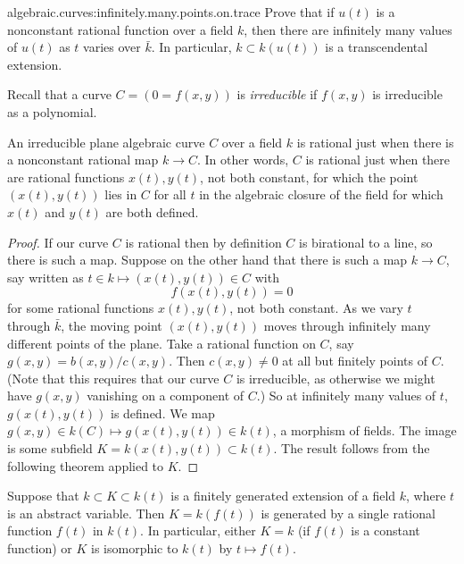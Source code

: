 \begin{problem}{algebraic.curves:infinitely.many.points.on.trace}
Prove that if \(u(t)\) is a nonconstant rational function over a field \(k\), then there are infinitely many values of \(u(t)\) as \(t\) varies over \(\bar{k}\).
In particular, \(k \subset k(u(t))\) is a transcendental extension.
\end{problem}
Recall that a curve \(C=(0=f(x,y))\) is \emph{irreducible}
%
% 
%
if \(f(x,y)\) is irreducible as a polynomial.
\begin{theorem}
An irreducible plane algebraic curve \(C\) over a field \(k\) is rational just when there is a nonconstant rational map \(k \to C\).
In other words, \(C\) is rational just when there are rational functions \(x(t),y(t)\), not both constant, for which the point \((x(t),y(t))\) lies in \(C\) for all \(t\) in the algebraic closure of the field for which \(x(t)\) and \(y(t)\) are both defined.
\end{theorem}
\begin{proof}
If our curve \(C\) is rational then by definition \(C\) is birational to a line, so there is such a map.
Suppose on the other hand that there is such a map \(k \to C\), say written as \(t \in k \mapsto (x(t),y(t)) \in C\) with
\[
f(x(t),y(t))=0
\]
for some rational functions \(x(t), y(t)\), not both constant.
As we vary \(t\) through \(\bar{k}\), the moving point \((x(t),y(t))\) moves through infinitely many different points of the plane.
Take a rational function on \(C\), say \(g(x,y)=b(x,y)/c(x,y)\).
Then \(c(x,y)\ne 0\) at all but finitely points of \(C\).
(Note that this requires that our curve \(C\) is irreducible, as otherwise we might have \(g(x,y)\) vanishing on a component of \(C\).)
So at infinitely many values of \(t\), \(g(x(t),y(t))\) is defined.
We map \(g(x,y) \in k(C) \mapsto g(x(t),y(t)) \in k(t)\), a morphism of fields. 
The image is some subfield \(K=k(x(t),y(t)) \subset k(t)\).
The result follows from the following theorem applied to \(K\).
\end{proof}
\begin{theorem}
Suppose that \(k \subset K \subset k(t)\) is a finitely generated extension of a field \(k\), where \(t\) is an abstract variable.
Then \(K=k(f(t))\) is generated by a single rational function \(f(t)\) in \(k(t)\).
In particular, either \(K=k\) (if \(f(t)\) is a constant function) or \(K\) is isomorphic to \(k(t)\) by \(t \mapsto f(t)\).
\end{theorem}
